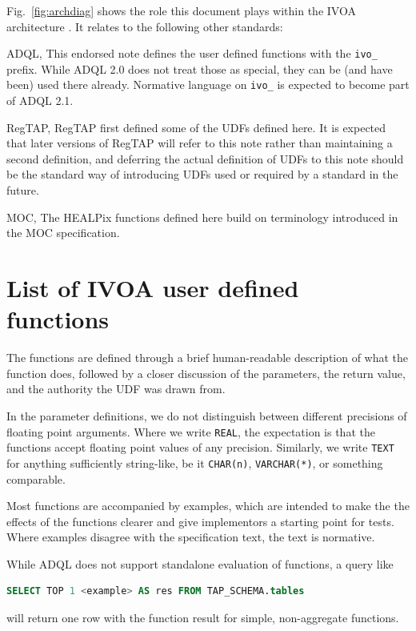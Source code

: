 \documentclass[11pt,a4paper]{ivoa}
\begin{document}
Fig.~\ref{fig:archdiag} shows the role this document plays within the
IVOA architecture \citep{note:VOARCH}.  It relates to the following
other standards:

\begin{bigdescription}
\item[ADQL, \citep{2008ivoa.spec.1030O}] This endorsed note defines the
user defined functions with the \verb|ivo_| prefix.  While ADQL 2.0
does not treat those as special, they can be (and have been) used there
already.  Normative language on \verb|ivo_| is expected to become
part of ADQL 2.1.

\item[RegTAP, \citep{2019ivoa.spec.1011D}] RegTAP first defined some of the
UDFs defined here.  It is expected that later versions of RegTAP will
refer to this note rather than maintaining a second definition, and
deferring the actual definition of UDFs to this note should be the
standard way of introducing UDFs used or required by a standard in the future.

\item[MOC, \citep{2019ivoa.spec.1007F}] The HEALPix functions defined
here build on terminology introduced in the MOC specification.
\end{bigdescription}


\section{List of IVOA user defined functions}

The functions are defined through a brief human-readable description of
what the function does, followed by a closer discussion of the
parameters, the return value, and the authority the UDF was drawn from.

In the parameter definitions, we do not distinguish between different
precisions of floating point arguments.  Where we write \texttt{REAL}, the
expectation is that the functions accept floating point values of any
precision.  Similarly, we write \texttt{TEXT} for anything sufficiently
string-like, be it \texttt{CHAR(n)}, \texttt{VARCHAR(*)}, or something
comparable.

Most functions are accompanied by examples, which are intended to make
the the effects of the functions clearer and give implementors a
starting point for tests.  Where examples disagree with the
specification text, the text is normative.

While ADQL does not support standalone evaluation of functions, a query
like 
\begin{lstlisting}[language=SQL]
  SELECT TOP 1 <example> AS res FROM TAP_SCHEMA.tables
\end{lstlisting}
will return one row with the function result for simple, non-aggregate
functions.
\end{document}
